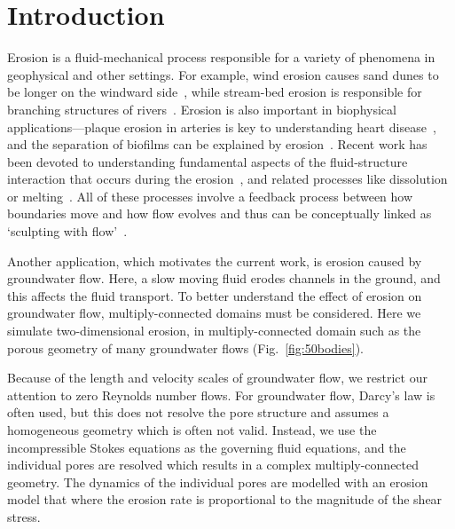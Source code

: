 \documentclass[preprint, 10pt]{elsarticle}
\begin{document}
\section{Introduction\label{s:intro}}

Erosion is a fluid-mechanical process responsible for a variety
of phenomena in geophysical and other settings.  For example,
wind erosion causes sand dunes to be  longer on the windward
side~\cite{han1969}, while stream-bed erosion is responsible for branching structures
of rivers~\cite{coh-dev-sey-yi-szy-rot2015}.  Erosion is
also important in biophysical applications---plaque erosion in arteries
is key to understanding heart disease~\cite{sha2002,
gro-gij-van-fer-hat-van-yua-wen2007}, and the separation of biofilms can
be explained by erosion~\cite{pic-van-hei2000}. 
Recent work has been devoted to understanding fundamental aspects of the fluid-structure interaction that occurs during the erosion~\cite{ris-moo-chi-she-zha2012, moo-ris-chi-zha-she2013, mit-spa2016, hewett2017evolution, moore2017riemann, lachaussee2018competitive, lopez2018cfd}, and related processes like dissolution or melting~\cite{Huang2015, kondratiuk2015steadily, rycroft2016asymmetric, cohen2016erosion, yuan2017dynamics, claudin2017dissolution, hewett2017pear}. All of these processes involve a feedback process between how boundaries move and how flow evolves and thus can be conceptually linked  as `sculpting with flow'~\cite{ristroph2018sculpting}.

Another application, which motivates the current work, is erosion caused by groundwater flow.
Here, a slow moving fluid erodes channels in the ground, and this
affects the fluid transport.  To better understand
the effect of erosion on groundwater flow, multiply-connected domains
must be considered.  Here we simulate two-dimensional erosion, in
multiply-connected domain such as the porous geometry of many
groundwater flows (Fig.~\ref{fig:50bodies}).

Because of the length and velocity scales of groundwater flow, we
restrict our attention to zero Reynolds number flows.  For groundwater
flow, Darcy's law is often used, but this does not resolve the pore
structure and assumes a homogeneous geometry which is often not valid.
Instead, we use the incompressible Stokes equations as the governing
fluid equations, and the individual pores are resolved which results in
a complex multiply-connected geometry.  The dynamics of the individual
pores are modelled with an erosion model that where the erosion rate is
proportional to the magnitude of the shear stress. 
\end{document}
